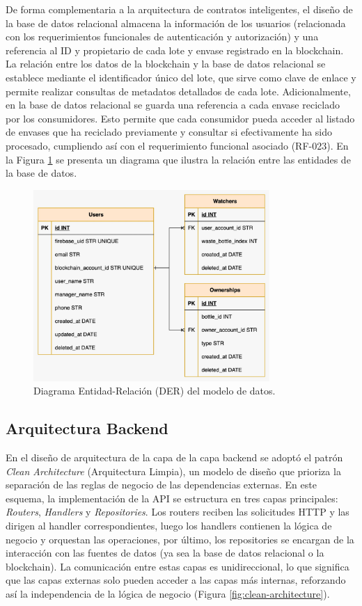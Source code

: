 De forma complementaria a la arquitectura de contratos inteligentes, el diseño de la base de datos relacional almacena la información de los usuarios (relacionada con los requerimientos funcionales de autenticación y autorización) y una referencia al ID y propietario de cada lote y envase registrado en la blockchain. La relación entre los datos de la blockchain y la base de datos relacional se establece mediante el identificador único del lote, que sirve como clave de enlace y permite realizar consultas de metadatos detallados de cada lote. Adicionalmente, en la base de datos relacional se guarda una referencia a cada envase reciclado por los consumidores. Esto permite que cada consumidor pueda acceder al listado de envases que ha reciclado previamente y consultar si efectivamente ha sido procesado, cumpliendo así con el requerimiento funcional asociado (RF-023). En la Figura \ref{fig:der} se presenta un diagrama que ilustra la relación entre las entidades de la base de datos.

\begin{figure}[!htb]
    \centering
    \includegraphics[width=0.8\textwidth]{Figures/db-der.png}
    \caption{Diagrama Entidad-Relación (DER) del modelo de datos.}
    \label{fig:der}
\end{figure}

\subsection{Arquitectura Backend}

En el diseño de arquitectura de la capa de la capa backend se adoptó el patrón \textit{Clean Architecture} (Arquitectura Limpia), un modelo de diseño que prioriza la separación de las reglas de negocio de las dependencias externas. En este esquema, la implementación de la API se estructura en tres capas principales: \textit{Routers}, \textit{Handlers} y \textit{Repositories}. Los routers reciben las solicitudes HTTP y las dirigen al handler correspondientes, luego los handlers contienen la lógica de negocio y orquestan las operaciones, por último, los repositories se encargan de la interacción con las fuentes de datos (ya sea la base de datos relacional o la blockchain). La comunicación entre estas capas es unidireccional, lo que significa que las capas externas solo pueden acceder a las capas más internas, reforzando así la independencia de la lógica de negocio (Figura \ref{fig:clean-architecture}).

